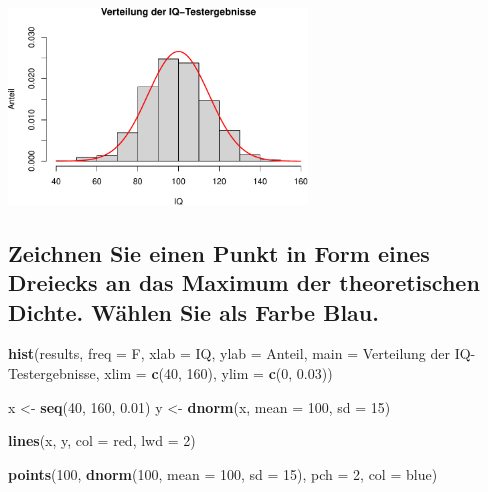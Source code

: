 \documentclass[12pt,a4paper]{article}
\newenvironment{Shaded}{\begin{snugshade}}{\end{snugshade}}
\newcommand{\AttributeTok}[1]{\textcolor[rgb]{0.13,0.29,0.53}{#1}}
\newcommand{\DecValTok}[1]{\textcolor[rgb]{0.00,0.00,0.81}{#1}}
\newcommand{\FloatTok}[1]{\textcolor[rgb]{0.00,0.00,0.81}{#1}}
\newcommand{\FunctionTok}[1]{\textcolor[rgb]{0.13,0.29,0.53}{\textbf{#1}}}
\newcommand{\NormalTok}[1]{#1}
\newcommand{\OtherTok}[1]{\textcolor[rgb]{0.56,0.35,0.01}{#1}}
\newcommand{\StringTok}[1]{\textcolor[rgb]{0.31,0.60,0.02}{#1}}
\begin{document}
\begin{center}\includegraphics[width=300px]{solution_3_files/figure-latex/unnamed-chunk-13-1} \end{center}

\subsection{Zeichnen Sie einen Punkt in Form eines Dreiecks an das
Maximum der theoretischen Dichte. Wählen Sie als Farbe
Blau.}\label{zeichnen-sie-einen-punkt-in-form-eines-dreiecks-an-das-maximum-der-theoretischen-dichte.-wuxe4hlen-sie-als-farbe-blau.}

\begin{Shaded}
\begin{Highlighting}[]
    \FunctionTok{hist}\NormalTok{(results, }
         \AttributeTok{freq =}\NormalTok{ F, }
         \AttributeTok{xlab =} \StringTok{\textquotesingle{}IQ\textquotesingle{}}\NormalTok{, }
         \AttributeTok{ylab =} \StringTok{\textquotesingle{}Anteil\textquotesingle{}}\NormalTok{, }
         \AttributeTok{main =} \StringTok{\textquotesingle{}Verteilung der IQ{-}Testergebnisse\textquotesingle{}}\NormalTok{, }
         \AttributeTok{xlim =} \FunctionTok{c}\NormalTok{(}\DecValTok{40}\NormalTok{, }\DecValTok{160}\NormalTok{), }
         \AttributeTok{ylim =} \FunctionTok{c}\NormalTok{(}\DecValTok{0}\NormalTok{, }\FloatTok{0.03}\NormalTok{))}
    
\NormalTok{    x }\OtherTok{\textless{}{-}} \FunctionTok{seq}\NormalTok{(}\DecValTok{40}\NormalTok{, }\DecValTok{160}\NormalTok{, }\FloatTok{0.01}\NormalTok{)}
\NormalTok{    y }\OtherTok{\textless{}{-}} \FunctionTok{dnorm}\NormalTok{(x, }\AttributeTok{mean =} \DecValTok{100}\NormalTok{, }\AttributeTok{sd =} \DecValTok{15}\NormalTok{)}
    
    \FunctionTok{lines}\NormalTok{(x, }
\NormalTok{          y, }
          \AttributeTok{col =} \StringTok{\textquotesingle{}red\textquotesingle{}}\NormalTok{, }
          \AttributeTok{lwd =} \DecValTok{2}\NormalTok{)}
    
    \FunctionTok{points}\NormalTok{(}\DecValTok{100}\NormalTok{, }
           \FunctionTok{dnorm}\NormalTok{(}\DecValTok{100}\NormalTok{, }\AttributeTok{mean =} \DecValTok{100}\NormalTok{, }\AttributeTok{sd =} \DecValTok{15}\NormalTok{), }
           \AttributeTok{pch =} \DecValTok{2}\NormalTok{, }
           \AttributeTok{col =} \StringTok{\textquotesingle{}blue\textquotesingle{}}\NormalTok{)}
\end{Highlighting}
\end{Shaded}
\end{document}
